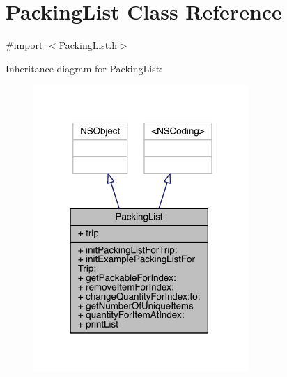 \hypertarget{interface_packing_list}{\section{Packing\-List Class Reference}
\label{interface_packing_list}
}


{\ttfamily \#import $<$Packing\-List.\-h$>$}



Inheritance diagram for Packing\-List\-:\nopagebreak
\begin{figure}[H]
\begin{center}
\leavevmode
\includegraphics[width=232pt]{interface_packing_list__inherit__graph}
\end{center}
\end{figure}


